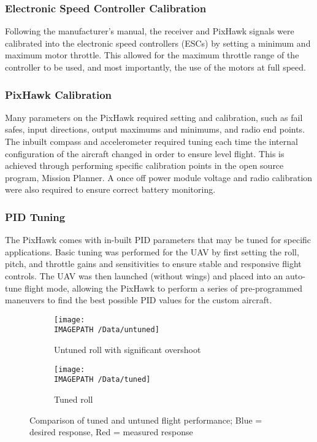 \subsubsection*{Electronic Speed Controller Calibration}
Following the manufacturer's manual, the receiver and PixHawk signals were calibrated into the electronic speed controllers (ESCs) by setting a minimum and maximum motor throttle. This allowed for the maximum throttle range of the controller to be used, and most importantly, the use of the motors at full speed.

\subsubsection*{PixHawk Calibration}
Many parameters on the PixHawk required setting and calibration, such as fail safes, input directions, output maximums and minimums, and radio end points. The inbuilt compass and accelerometer required tuning each time the internal configuration of the aircraft changed in order to ensure level flight. This is achieved through performing specific calibration points in the open source program, Mission Planner. A once off power module voltage and radio calibration were also required to ensure correct battery monitoring. 


\subsubsection*{PID Tuning}
The PixHawk comes with in-built PID parameters that may be tuned for specific applications. Basic tuning was performed for the UAV by first setting the roll, pitch, and throttle gains and sensitivities to ensure stable and responsive flight controls. The UAV was then launched (without wings) and placed into an auto-tune flight mode, allowing the PixHawk to perform a series of pre-programmed maneuvers to find the best possible PID values for the custom aircraft.\\

\begin{figure}[!ht]
	\centering
	\begin{subfigure}{.5\textwidth}
		\texttt{[image: \\IMAGEPATH /Data/untuned]}
		\caption{Untuned roll with significant overshoot}
		\label{fig:untunedroll}
	\end{subfigure}%
	\begin{subfigure}{.5\textwidth}
		\centering
		\texttt{[image: \\IMAGEPATH /Data/tuned]}
		\caption{Tuned roll}
		\label{fig:tunedroll}
	\end{subfigure}
	\caption{Comparison of tuned and untuned flight performance; Blue = desired response, Red = measured response}
	\label{fig:tune1}
\end{figure}

